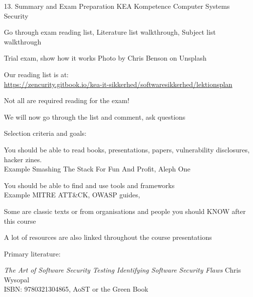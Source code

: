 \documentclass[Screen16to9,17pt]{foils}
\begin{document}
\mytitlepage
{13. Summary and Exam Preparation}
{KEA Kompetence Computer Systems Security}





\begin{list1}
\item Go through exam reading list, Literature list walkthrough, Subject list walkthrough
\item Trial exam, show how it works \hfill {\small Photo by Chris Benson on Unsplash}

\end{list1}




\begin{list1}
\item Our reading list is at:\\
{\small\url{https://zencurity.gitbook.io/kea-it-sikkerhed/softwaresikkerhed/lektionsplan}}
\item Not all are required reading for the exam!
\item We will now go through the list and comment, ask questions
\item Selection criteria and goals:
\begin{list2}
\item You should be able to read books, presentations, papers, vulnerability disclosures, hacker zines. \\
Example Smashing The Stack For Fun And Profit, Aleph One
\item You should be able to find and use tools and frameworks\\
Example MITRE ATT\&CK, OWASP guides,
\end{list2}
\item Some are classic texts or from organisations and people you should KNOW after this course
\item A lot of resources are also linked throughout the course presentations
\end{list1}





Primary literature:
\begin{list2}
\item \emph{The Art of Software Security Testing Identifying Software Security Flaws}
Chris Wysopal\\
ISBN: 9780321304865, AoST or the Green Book
\end{list2}
\end{document}

